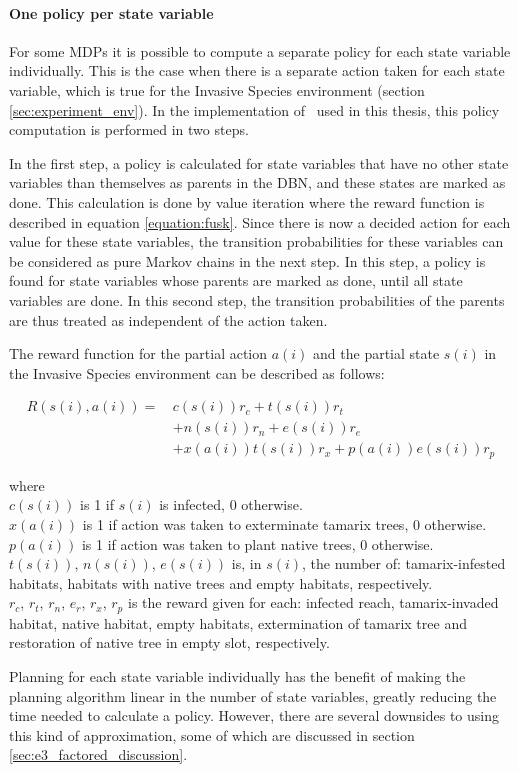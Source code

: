 \paragraph{One policy per state variable}
\label{sec:one_policy_per_state_variable}

For some MDPs it is possible to compute a separate policy for each state
variable individually. This is the case when there is a separate action taken
for each state variable, which is true for the Invasive Species environment
(section \ref{sec:experiment_env}). In the implementation of \etre\ used in
this thesis, this policy computation is performed in two steps. 

In the first step, a policy is calculated for state variables that have no
other state variables than themselves as parents in the DBN, and these states
are marked as done. This calculation is done by value iteration where the reward function
is described in equation \eqref{equation:fusk}. Since there is now a decided action for each value for
these state variables, the transition probabilities for these variables can be
considered as pure Markov chains in the next step. In this step, a policy is
found for state variables whose parents are marked as done, until all state
variables are done. In this second step, the transition probabilities of the
parents are thus treated as independent of the action taken.

The reward function for the partial action $a(i)$ and the partial state $s(i)$ in the Invasive Species environment can be described as follows:

\begin{align}
\label{equation:fusk}
R(s(i),a(i)) = \, 
 & c(s(i)) r_c + t(s(i)) r_t  \nonumber \\
 & + n(s(i)) r_n + e(s(i)) r_e   \nonumber \\
 & +  x(a(i)) t(s(i)) r_x + p(a(i)) e(s(i)) r_p
\end{align}

where \\
$c(s(i))$ is 1 if $s(i)$ is infected, 0 otherwise. \\
$x(a(i))$ is 1 if action was taken to exterminate tamarix trees, 0 otherwise. \\
$p(a(i))$ is 1 if action was taken to plant native trees, 0 otherwise. \\
$t(s(i))$, $n(s(i))$, $e(s(i))$ is, in $s(i)$, the number of: tamarix-infested habitats, habitats with native trees and empty habitats, respectively. \\
$r_c$, $r_t$, $r_n$, $e_r$, $r_x$, $r_p$ is the reward given for each: infected reach, tamarix-invaded habitat, native habitat, empty habitats, extermination of tamarix tree and restoration of native tree in empty slot, respectively.

Planning for each state variable individually has the benefit of making the
planning algorithm linear in the number of state variables, greatly reducing
the time needed to calculate a policy. However, there are several downsides to
using this kind of approximation, some of which are discussed in section
\ref{sec:e3_factored_discussion}. 
